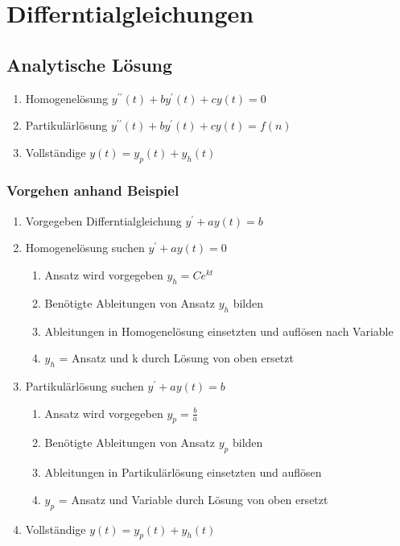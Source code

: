 \section{Differntialgleichungen}

\subsection{Analytische Lösung}
\begin{enumerate}
    \item Homogenelösung $ y^{\prime \prime}(t) + by^{\prime}(t) + cy(t) = 0 $
    \item Partikulärlösung  $ y^{\prime \prime}(t) + by^{\prime}(t) + cy(t) = f(n) $
    \item Vollständige $ y(t) = y_{p}(t) + y_{h}(t) $
\end{enumerate}

\subsubsection{Vorgehen anhand Beispiel}
\begin{enumerate}
    \item Vorgegeben Differntialgleichung $ y^{\prime} + ay(t) = b $
    \item Homogenelösung suchen  $ y^{\prime} + ay(t) = 0 $
    \begin{enumerate}
        \item Ansatz wird vorgegeben $y_{h} = Ce^{kt}$
        \item Benötigte Ableitungen von Ansatz $y_{h}$ bilden 
        \item Ableitungen in Homogenelösung einsetzten und auflösen nach Variable
        \item $y_{h}$ = Ansatz und k durch Lösung von oben ersetzt
    \end{enumerate}
    \item Partikulärlösung suchen  $ y^{\prime} + ay(t) = b $
        \begin{enumerate}
        \item Ansatz wird vorgegeben $y_{p} =\frac{b}{a}$
        \item Benötigte Ableitungen von Ansatz $y_{p}$ bilden 
        \item Ableitungen in Partikulärlösung einsetzten und auflösen
        \item $y_{p}$ = Ansatz und Variable durch Lösung von oben ersetzt
    \end{enumerate}
    \item Vollständige $ y(t) = y_{p}(t) + y_{h}(t) $
\end{enumerate}

